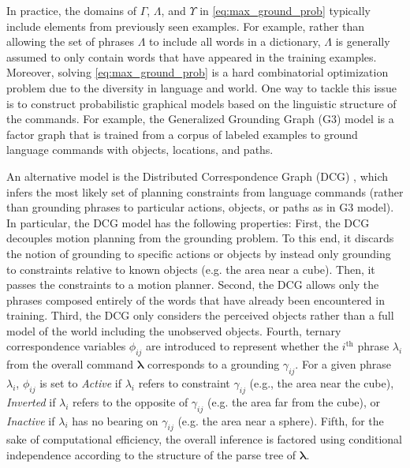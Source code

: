 In practice, the domains of $\Gamma$, $\Lambda$, and $\Upsilon$ in \eqref{eq:max_ground_prob} typically include elements from previously seen examples. %
For example, rather than allowing the set of phrases $\Lambda$ to include all words in a dictionary, $\Lambda$ is generally assumed to only contain words that have appeared in the training examples. Moreover, solving \eqref{eq:max_ground_prob} is a hard combinatorial optimization problem due to the diversity in language and world.
One way to tackle this issue is to construct probabilistic graphical models based on the linguistic structure of the commands. For example, the Generalized Grounding Graph (G3) model \cite{g3} is a factor graph that is trained from a corpus of labeled examples to ground language commands with objects, locations, and paths.  

An alternative model is the Distributed Correspondence Graph (DCG) \cite{dcg}, which infers the most likely set of planning constraints from language commands (rather than grounding phrases to particular actions, objects, or paths as in G3 model). In particular, the DCG model has the following properties:  
First, the DCG decouples motion planning from the grounding problem. To this end, it discards the notion of grounding to specific actions or objects by instead only grounding to constraints relative to known objects (e.g. the area near a cube). Then, it passes the constraints to a motion planner.
Second, the DCG allows only the phrases composed entirely of the words that have already been encountered in training.
Third, the DCG only considers the perceived objects rather than a full model of the world including the unobserved objects.
Fourth, ternary correspondence variables $\phi_{ij}$ are introduced to represent whether the $i^\text{th}$ phrase $\lambda_i$ from the overall command $\boldsymbol{\lambda}$ corresponds to a grounding $\gamma_{ij}$.
For a given phrase $\lambda_i$, $\phi_{ij}$ is set to \emph{Active} if $\lambda_i$ refers to constraint $\gamma_{ij}$ (e.g., the area near the cube), \emph{Inverted} if $\lambda_i$ refers to the opposite of $\gamma_{ij}$ (e.g. the area far from the cube), or \emph{Inactive} if $\lambda_i$ has no bearing on $\gamma_{ij}$ (e.g. the area near a sphere).
Fifth, for the sake of computational efficiency, the overall inference is factored using conditional independence according to the structure of the parse tree of $\boldsymbol{\lambda}$.

